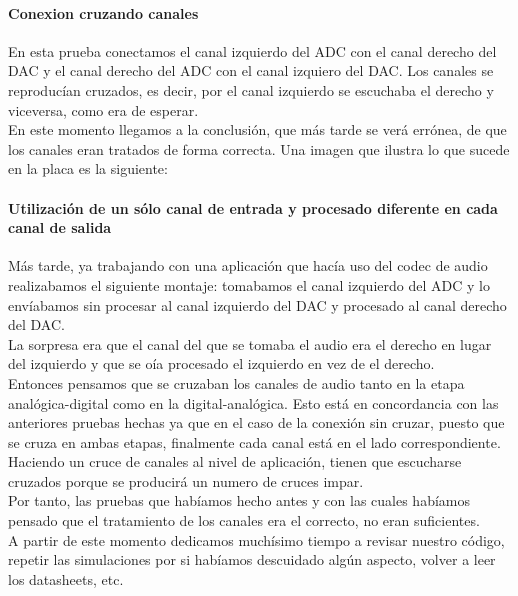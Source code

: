 		\paragraph{Conexion cruzando canales}
			En esta prueba conectamos el canal izquierdo del ADC con el canal derecho del DAC y el canal derecho del ADC con el canal izquiero del DAC. Los canales se reproducían cruzados, es decir, por el canal izquierdo se escuchaba el derecho y viceversa, como era de esperar.\\

En este momento llegamos a la conclusión, que más tarde se verá errónea, de que los canales eran tratados de forma correcta. Una imagen que ilustra lo que sucede en la placa es la siguiente:


		\paragraph{Utilización de un sólo canal de entrada y procesado diferente en cada canal de salida}
	
			Más tarde, ya trabajando con una aplicación que hacía uso del codec de audio realizabamos el siguiente montaje: tomabamos el canal izquierdo del ADC y lo envíabamos sin procesar al canal izquierdo del DAC y procesado al canal derecho del DAC.\\

La sorpresa era que el canal del que se tomaba el audio era el derecho en lugar del izquierdo y que se oía procesado el izquierdo en vez de el derecho.\\

Entonces pensamos que se cruzaban los canales de audio tanto en la etapa analógica-digital como en la digital-analógica. Esto está en concordancia con las anteriores pruebas hechas ya que en el caso de la conexión sin cruzar, puesto que se cruza en ambas etapas, finalmente cada canal está en el lado correspondiente.\\

Haciendo un cruce de canales al nivel de aplicación, tienen que escucharse cruzados porque se producirá un numero de cruces impar.\\

Por tanto, las pruebas que habíamos hecho antes y con las cuales habíamos pensado que el tratamiento de los canales era el correcto, no eran suficientes.\\

A partir de este momento dedicamos muchísimo tiempo a revisar nuestro código, repetir las simulaciones por si habíamos descuidado algún aspecto, volver a leer los datasheets, etc.\\

